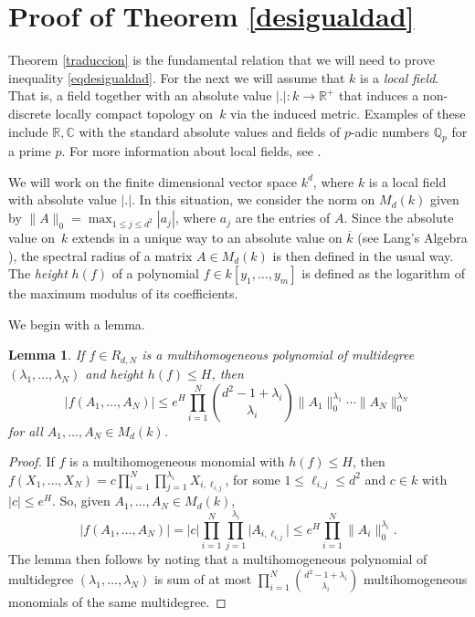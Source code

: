 \documentclass[11pt]{article}
\theoremstyle{plain}
\newtheorem{lema}[teo]{Lemma}
\theoremstyle{definition}
\newcommand{\CC}{\mathbb{C}}
\newcommand{\RR}{\mathbb{R}}
\begin{document}
\section{Proof of Theorem \ref{desigualdad}}\label{pruebadesigualdad}

Theorem \ref{traduccion} is the fundamental relation that we will need to prove inequality \eqref{eqdesigualdad}. For the next we will assume that $k$ is a \textit{local field}. That is, a field together with an absolute value $|.|:k\rightarrow \RR^{+}$ that induces a non-discrete locally compact topology on~$k$ via the induced metric. Examples of these include $\RR,\CC$ with the standard absolute values and fields of $p$-adic numbers $\mathbb{Q}_{p}$ for a prime $p$. For more information about local fields, see \cite{lorentz}.

We will work on the finite dimensional vector space $k^d$, where $k$ is a local field with absolute value $|.|$. In this situation, we consider the norm on $M_{d}(k)$ given by $\|A\|_{0}=\max_{1\leq j\leq d^2}{|a_{j}|}$, where $a_j$ are the entries of $A$. Since the absolute value on~$k$ extends in a unique way to an absolute value on $\overline{k}$ (see Lang's Algebra \cite[XII.2, Prop.\,2.5]{langalg}), the spectral radius of a matrix $A\in M_{d}(k)$ is then defined in the usual way.
The \emph{height} $h(f)$ of a polynomial $f\in k[y_1,\dots,y_m]$ is defined as the logarithm of the maximum modulus of its coefficients.

We begin with a lemma.

\begin{lema}\label{cotahomo}If $f \in R_{d,N}$ is a multihomogeneous polynomial of multidegree $(\lambda_1,\dots,\lambda_{N})$ and height $h(f)\leq H$, then
\begin{equation*}
|f(A_1,\dots,A_N)|\leq e^H\prod_{i=1}^{N}{\binom{d^2-1+\lambda_i}{\lambda_i}}\|A_1\|_{0}^{\lambda_1}\cdots\|A_{N}\|_{0}^{\lambda_N}
\end{equation*}
for all $A_1,\dots,A_N\in M_{d}(k)$.
\end{lema}

\begin{proof}
If $f$ is a multihomogeneous monomial with $h(f)\!\leq\!H$, then
$f(X_1,\dots,X_N)=c\prod_{i=1}^{N}{\prod_{j=1}^{\lambda_{i}}{X_{i ,\ell_{i,j}}}}$, for some $1\leq\ell_{i,j} \leq d^2$ and $c\in k$ with $|c|\leq e^H$. So, given $A_1,\dots,A_N\in M_{d}(k)$,
\begin{equation*}
|f(A_1,\dots,A_N)|=|c|\prod_{i=1}^{N}{\prod_{j=1}^{\lambda_{i}}{|A_{i ,\ell_{i,j}}}|}\leq e^H\prod_{i=1}^{N}{\|A_i\|_{0}^{\lambda_{i}}}.
\end{equation*}
The lemma then follows by noting that a multihomogeneous polynomial of multidegree $(\lambda_1,\dots,\lambda_N)$ is sum of at most $\prod_{i=1}^{N}{\binom{d^2-1+\lambda_i}{\lambda_i}}$ multihomogeneous monomials of the same multidegree.
\end{proof}
\end{document}
